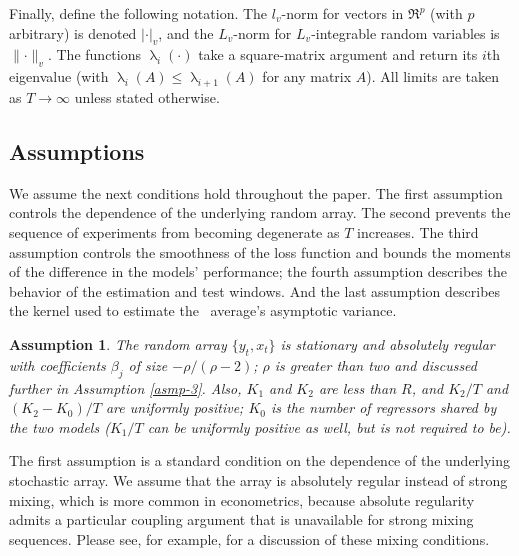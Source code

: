 \documentclass[11pt]{article}
\DeclareMathOperator{\eigen}{\lambda}
\newtheorem{asmp}{Assumption}
\begin{document}
Finally, define the following notation.  The $l_v$-norm for vectors in
$\Re^p$ (with $p$ arbitrary) is denoted $\lvert \cdot \rvert_v$, and
the $L_v$-norm for $L_v$-integrable random variables is $\lVert \cdot
\rVert_v$.  The functions $\eigen_i(\cdot)$ take a square-matrix
argument and return its $i$th eigenvalue (with $\eigen_{i}(A) \leq
\eigen_{i+1}(A)$ for any matrix $A$).  All limits are taken as $T \to
\infty$ unless stated otherwise.

\subsection{Assumptions}

We assume the next conditions hold throughout the paper.  The first
assumption controls the dependence of the underlying random array.
The second prevents the sequence of experiments from becoming
degenerate as $T$ increases.  The third assumption controls the
smoothness of the loss function and bounds the moments of the
difference in the models' performance; the fourth assumption describes
the behavior of the estimation and test windows.  And the last
assumption describes the kernel used to estimate the \oos\ average's
asymptotic variance.

\begin{asmp}\label{asmp-1}
  The random array $\{y_t,x_t\}$ is stationary and absolutely regular
  with coefficients $\beta_j$ of size $-\rho/(\rho-2)$; $\rho$ is
  greater than two and discussed further in Assumption \ref{asmp-3}.
  Also, $K_1$ and $K_2$ are less than $R$, and $K_2/T$ and
  $(K_2-K_0)/T$ are uniformly positive; $K_0$ is the number of
  regressors shared by the two models ($K_1/T$ can be uniformly
  positive as well, but is not required to be).
\end{asmp}

The first assumption is a standard condition on the dependence of the
underlying stochastic array.  We assume that the array is absolutely
regular instead of strong mixing, which is more common in
econometrics, because absolute regularity admits a particular coupling
argument \citep[reproduced in this paper as Lemma A.1]{Ber:79} that is
unavailable for strong mixing sequences.  Please see, for example,
\citet{Dav:94} for a discussion of these mixing conditions.
\end{document}
